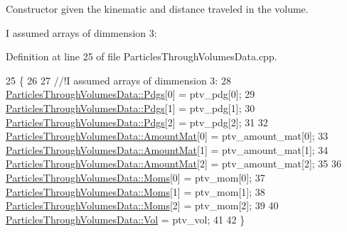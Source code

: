 Constructor given the kinematic and distance traveled in the volume. 

I assumed arrays of dimmension 3\-: 

Definition at line 25 of file Particles\-Through\-Volumes\-Data.\-cpp.


\begin{DoxyCode}
25                                                                                                            
                               \{
26 \textcolor{comment}{}
27 \textcolor{comment}{     //!I assumed arrays of dimmension 3:}
28 \textcolor{comment}{}    \hyperlink{class_neutrino_flux_reweight_1_1_particles_through_volumes_data_aa4f638f9eebba5ba2d59f909c077fa19}{ParticlesThroughVolumesData::Pdgs}[0] = ptv\_pdg[0];
29     \hyperlink{class_neutrino_flux_reweight_1_1_particles_through_volumes_data_aa4f638f9eebba5ba2d59f909c077fa19}{ParticlesThroughVolumesData::Pdgs}[1] = ptv\_pdg[1];
30     \hyperlink{class_neutrino_flux_reweight_1_1_particles_through_volumes_data_aa4f638f9eebba5ba2d59f909c077fa19}{ParticlesThroughVolumesData::Pdgs}[2] = ptv\_pdg[2];
31     
32     \hyperlink{class_neutrino_flux_reweight_1_1_particles_through_volumes_data_a897eba4f8766a1c110c4e473150f6c6e}{ParticlesThroughVolumesData::AmountMat}[0] = ptv\_amount\_mat[0];
33     \hyperlink{class_neutrino_flux_reweight_1_1_particles_through_volumes_data_a897eba4f8766a1c110c4e473150f6c6e}{ParticlesThroughVolumesData::AmountMat}[1] = ptv\_amount\_mat[1];
34     \hyperlink{class_neutrino_flux_reweight_1_1_particles_through_volumes_data_a897eba4f8766a1c110c4e473150f6c6e}{ParticlesThroughVolumesData::AmountMat}[2] = ptv\_amount\_mat[2];
35 
36     \hyperlink{class_neutrino_flux_reweight_1_1_particles_through_volumes_data_a373e722f967c878fa1749ae224a721fc}{ParticlesThroughVolumesData::Moms}[0] = ptv\_mom[0];
37     \hyperlink{class_neutrino_flux_reweight_1_1_particles_through_volumes_data_a373e722f967c878fa1749ae224a721fc}{ParticlesThroughVolumesData::Moms}[1] = ptv\_mom[1];
38     \hyperlink{class_neutrino_flux_reweight_1_1_particles_through_volumes_data_a373e722f967c878fa1749ae224a721fc}{ParticlesThroughVolumesData::Moms}[2] = ptv\_mom[2];
39     
40     \hyperlink{class_neutrino_flux_reweight_1_1_particles_through_volumes_data_a7981341eb993e13d4512cf438c1c2e52}{ParticlesThroughVolumesData::Vol} = ptv\_vol;
41     
42   \}
\end{DoxyCode}
